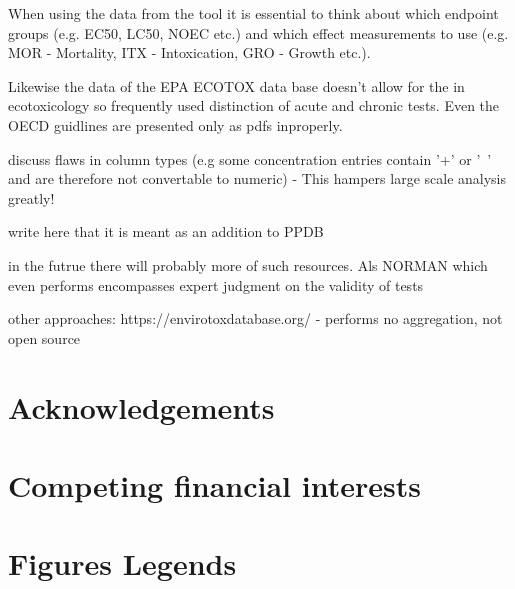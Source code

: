 \documentclass[english]{article}
\newcommand{\epa}{EPA ECOTOX data base}
\begin{document}
When using the data from the tool it is essential to think about which endpoint groups (e.g. EC50, LC50, NOEC etc.) and which effect measurements to use (e.g. MOR - Mortality, ITX - Intoxication, GRO - Growth etc.).

Likewise the data of the \epa{} doesn't allow for the in ecotoxicology so frequently used distinction of acute and chronic tests. Even the OECD guidlines are presented only as pdfs inproperly.



discuss flaws in column types (e.g some concentration entries contain '+' or '~' and are therefore not convertable to numeric) - This hampers large scale analysis greatly!


write here that it is meant as an addition to PPDB

in the futrue there will probably more of such resources. Als NORMAN which even performs encompasses expert judgment on the validity of tests

other approaches: https://envirotoxdatabase.org/ - performs no aggregation, not open source



\section*{Acknowledgements}


\section*{Competing financial interests}


\section*{Figures Legends}
\end{document}
